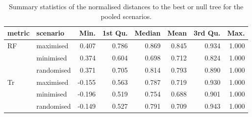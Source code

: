 \begin{table}[ht]
\centering
\begin{tabular}{llrrrrrr}
  \hline
metric & scenario & Min. & 1st Qu. & Median & Mean & 3rd Qu. & Max. \\ 
  \hline
RF & maximised & 0.407 & 0.786 & 0.869 & 0.845 & 0.934 & 1.000 \\ 
   & minimised & 0.374 & 0.604 & 0.698 & 0.712 & 0.824 & 1.000 \\ 
   & randomised & 0.371 & 0.705 & 0.814 & 0.793 & 0.890 & 1.000 \\ 
  Tr & maximised & -0.155 & 0.563 & 0.787 & 0.719 & 0.930 & 1.000 \\ 
   & minimised & -0.196 & 0.519 & 0.754 & 0.688 & 0.901 & 1.000 \\ 
   & randomised & -0.149 & 0.527 & 0.791 & 0.709 & 0.943 & 1.000 \\ 
   \hline
\end{tabular}
\caption{Summary statistics of the normalised distances to the best or null tree for the pooled scenarios.} 
\label{Tab_pooledscenarios}
\end{table}
